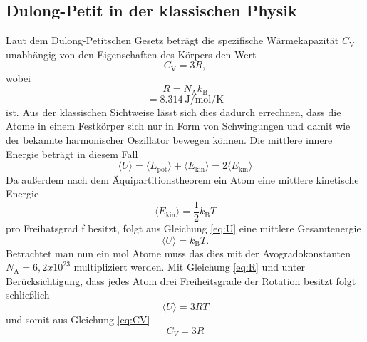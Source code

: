 \subsection{Dulong-Petit in der klassischen Physik}
Laut dem Dulong-Petitschen Gesetz beträgt die spezifische Wärmekapazität $C_\text{V}$ unabhängig von den Eigenschaften des Körpers den Wert \[C_\text{V}=3R,\]
wobei \begin{equation}
R = N_\text{A} k_\text{B} \label{eq:R}
\end{equation}
\begin{equation*}= \SI{8,314}{\joule\per\mol\per\kelvin}
\end{equation*} ist.
Aus der klassischen Sichtweise lässt sich dies dadurch errechnen, dass die Atome in einem Festkörper sich nur in Form 
von Schwingungen und damit wie der bekannte harmonischer Oszillator bewegen können.
Die mittlere innere Energie beträgt in diesem Fall
\begin{equation}
\langle U \rangle = \langle E_\text{pot} \rangle + \langle E_\text{kin}\rangle= 2 \langle E_\text{kin} \rangle \label{eq:U}
\end{equation}
Da außerdem nach dem Äquipartitionstheorem ein Atom eine mittlere kinetische Energie
\begin{equation*}
\langle E_\text{kin}\rangle = \frac{1}{2}k_\text{B}T
\end{equation*}
pro Freihatsgrad f besitzt, folgt aus Gleichung \eqref{eq:U} eine mittlere Gesamtenergie
\begin{equation}
\langle U \rangle= k_\text{B}T. \label{eq:U2}
\end{equation}
Betrachtet man nun ein $\si{\mol}$ Atome muss das dies mit der Avogradokonstanten $N_\text{A} = 6,2 x10^{23}$ multipliziert werden.
Mit Gleichung \eqref{eq:R} und unter Berücksichtigung, dass jedes Atom drei Freiheitsgrade der Rotation besitzt folgt schließlich
\begin{equation}
\langle U \rangle = 3RT \label{eq:U3}
\end{equation}
und somit aus Gleichung \eqref{eq:CV}
\begin{equation}
C_V = 3R \label{eq:CV2}
\end{equation}
